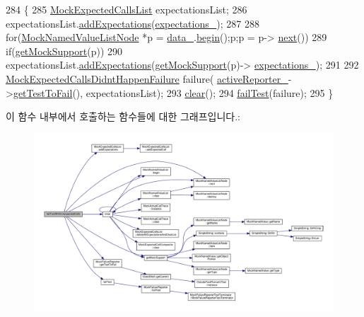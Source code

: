 \begin{DoxyCode}
284 \{
285     \hyperlink{class_mock_expected_calls_list}{MockExpectedCallsList} expectationsList;
286     expectationsList.\hyperlink{class_mock_expected_calls_list_a391840ec7f7c5cef242747f126ce4484}{addExpectations}(\hyperlink{class_mock_support_a8f02a0b866ff54bef3fb38cd8bc57fa2}{expectations\_});
287 
288     \textcolor{keywordflow}{for}(\hyperlink{class_mock_named_value_list_node}{MockNamedValueListNode} *p = \hyperlink{class_mock_support_a26b06d2d43a7804c9aa5808409c0c1ee}{data\_}.\hyperlink{class_mock_named_value_list_a4a5976d05542385eb64ea73eee7fc59c}{begin}();p;p = p->
      \hyperlink{class_mock_named_value_list_node_adaf0ca3232d35f7efae1bade86b8027e}{next}())
289         \textcolor{keywordflow}{if}(\hyperlink{class_mock_support_a575951d416e49f54fd1a3fc4823609e3}{getMockSupport}(p))
290             expectationsList.\hyperlink{class_mock_expected_calls_list_a391840ec7f7c5cef242747f126ce4484}{addExpectations}(\hyperlink{class_mock_support_a575951d416e49f54fd1a3fc4823609e3}{getMockSupport}(p)->
      \hyperlink{class_mock_support_a8f02a0b866ff54bef3fb38cd8bc57fa2}{expectations\_});
291 
292     \hyperlink{class_mock_expected_calls_didnt_happen_failure}{MockExpectedCallsDidntHappenFailure} failure(
      \hyperlink{class_mock_support_a75833f9457ebccff4c6e8b55529313fb}{activeReporter\_}->\hyperlink{class_mock_failure_reporter_ae3f75fac53b4d3395e02ee8eca858422}{getTestToFail}(), expectationsList);
293     \hyperlink{class_mock_support_ac8bb3912a3ce86b15842e79d0b421204}{clear}();
294     \hyperlink{class_mock_support_a569bf29b3fe0256d75f48c288e4a4085}{failTest}(failure);
295 \}
\end{DoxyCode}


이 함수 내부에서 호출하는 함수들에 대한 그래프입니다.\+:
\nopagebreak
\begin{figure}[H]
\begin{center}
\leavevmode
\includegraphics[width=350pt]{class_mock_support_a9eb46acf7715cffd19f883f1b3d69fbc_cgraph}
\end{center}
\end{figure}




